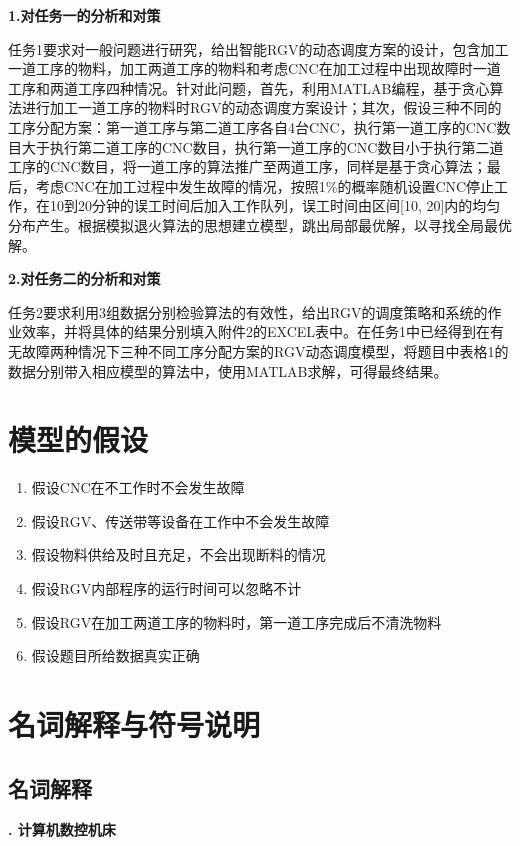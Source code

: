 \documentclass[no-math,withoutpreface,bwprint]{cumcmthesis} %
\numberwithin{equation}{section}
\numberwithin{figure}{section}
\numberwithin{table}{section}
\begin{document}
{\bfseries\song1.对任务一的分析和对策}

任务1要求对一般问题进行研究，给出智能RGV的动态调度方案的设计，包含加工一道工序的物料，加工两道工序的物料和考虑CNC在加工过程中出现故障时一道工序和两道工序四种情况。针对此问题，首先，利用MATLAB编程，基于贪心算法进行加工一道工序的物料时RGV的动态调度方案设计；其次，假设三种不同的工序分配方案：第一道工序与第二道工序各自4台CNC，执行第一道工序的CNC数目大于执行第二道工序的CNC数目，执行第一道工序的CNC数目小于执行第二道工序的CNC数目，将一道工序的算法推广至两道工序，同样是基于贪心算法；最后，考虑CNC在加工过程中发生故障的情况，按照1\%的概率随机设置CNC停止工作，在10到20分钟的误工时间后加入工作队列，误工时间由区间[10, 20]内的均匀分布产生。根据模拟退火算法的思想建立模型，跳出局部最优解，以寻找全局最优解。

{\bfseries\song2.对任务二的分析和对策}

任务2要求利用3组数据分别检验算法的有效性，给出RGV的调度策略和系统的作业效率，并将具体的结果分别填入附件2的EXCEL表中。在任务1中已经得到在有无故障两种情况下三种不同工序分配方案的RGV动态调度模型，将题目中表格1的数据分别带入相应模型的算法中，使用MATLAB求解，可得最终结果。

\section{模型的假设}
\begin{enumerate}[label=\arabic*.]
\item 假设CNC在不工作时不会发生故障 
\item 假设RGV、传送带等设备在工作中不会发生故障
\item 假设物料供给及时且充足，不会出现断料的情况
\item 假设RGV内部程序的运行时间可以忽略不计
\item 假设RGV在加工两道工序的物料时，第一道工序完成后不清洗物料
\item 假设题目所给数据真实正确

\end{enumerate}

\section{名词解释与符号说明}

\subsection{名词解释}

{\bfseries{}. 计算机数控机床}
\end{document}
